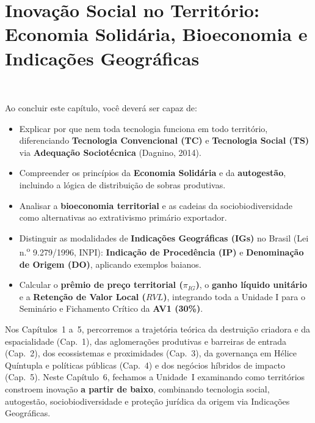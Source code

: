 \chapter{Inovação Social no Território: Economia Solidária, Bioeconomia e Indicações Geográficas}
\label{cap:unid1_cap06}

\noindent{}\ \tagTerritorio

\vspace{6pt}

\begin{capObjetivos}
Ao concluir este capítulo, você deverá ser capaz de:
\begin{itemize}[leftmargin=1.4em, itemsep=3pt]
  \item Explicar por que nem toda tecnologia funciona em todo território, diferenciando \textbf{Tecnologia Convencional (TC)} e \textbf{Tecnologia Social (TS)} via \textbf{Adequação Sociotécnica} (Dagnino, 2014).
  \item Compreender os princípios da \textbf{Economia Solidária} e da \textbf{autogestão}, incluindo a lógica de distribuição de sobras produtivas.
  \item Analisar a \textbf{bioeconomia territorial} e as cadeias da sociobiodiversidade como alternativas ao extrativismo primário exportador.
  \item Distinguir as modalidades de \textbf{Indicações Geográficas (IGs)} no Brasil (Lei n.\textsuperscript{o} 9.279/1996, INPI): \textbf{Indicação de Procedência (IP)} e \textbf{Denominação de Origem (DO)}, aplicando exemplos baianos.
  \item Calcular o \textbf{prêmio de preço territorial ($\pi_{IG}$)}, o \textbf{ganho líquido unitário} e a \textbf{Retenção de Valor Local ($RVL$)}, integrando toda a Unidade I para o Seminário e Fichamento Crítico da \textbf{AV1 (30\%)}.
\end{itemize}
\end{capObjetivos}

\begin{capRevisao}
Nos Capítulos~1 a~5, percorremos a trajetória teórica da destruição criadora e da espacialidade (Cap.~1), das aglomerações produtivas e barreiras de entrada (Cap.~2), dos ecossistemas e proximidades (Cap.~3), da governança em Hélice Quíntupla e políticas públicas (Cap.~4) e dos negócios híbridos de impacto (Cap.~5). Neste Capítulo~6, fechamos a Unidade~I examinando como territórios constroem inovação \textbf{a partir de baixo}, combinando tecnologia social, autogestão, sociobiodiversidade e proteção jurídica da origem via Indicações Geográficas.
\end{capRevisao}

